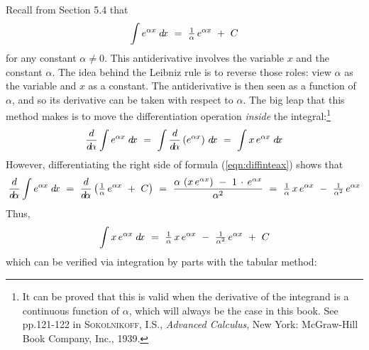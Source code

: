 Recall from Section 5.4 that
\begin{equation}
\int e^{\alpha x}\;d\!x ~=~ \tfrac{1}{\alpha}\,e^{\alpha x} ~+~ C\label{eqn:diffinteax}
\end{equation}
for any constant $\alpha \ne 0$. This antiderivative involves the variable $x$
and the constant $\alpha$. The idea behind the Leibniz rule is to reverse those
roles: view $\alpha$ as the variable and $x$ as a constant. The antiderivative
is then seen as a function of $\alpha$, and so its derivative can be taken with
respect to $\alpha$. The big leap that this method makes is to move the
differentiation operation \emph{inside} the integral:\footnote{It can be proved
that this is valid when the derivative of the integrand is a continuous function
of $\alpha$, which will always be the case in this book. See pp.121-122 in
\textsc{Sokolnikoff, I.S.}, \emph{Advanced Calculus}, New York: McGraw-Hill Book
Company, Inc., 1939.}
\[
\frac{d}{d\!\alpha} \int e^{\alpha x}\;d\!x ~=~
\int \frac{d}{d\!\alpha}\,(e^{\alpha x})~d\!x ~=~ \int x\,e^{\alpha x}\;d\!x
\]
However, differentiating the right side of formula (\ref{eqn:diffinteax})
shows that
\[
\frac{d}{d\!\alpha} \int e^{\alpha x}\;d\!x ~=~
\frac{d}{d\!\alpha} \left(\tfrac{1}{\alpha}\,e^{\alpha x} ~+~ C\right) ~=~
\frac{\alpha\,\left(x\,e^{\alpha x}\right) ~-~ 1\,\cdot\,e^{\alpha x}}{\alpha^2} ~=~
\tfrac{1}{\alpha}\,x\,e^{\alpha x} ~-~ \tfrac{1}{\alpha^2}\,e^{\alpha x}
\]
Thus,
\[
\int x\,e^{\alpha x}\;d\!x ~=~
\tfrac{1}{\alpha}\,x\,e^{\alpha x} ~-~ \tfrac{1}{\alpha^2}\,e^{\alpha x} ~+~ C
\]
which can be verified via integration by parts with the tabular method:

